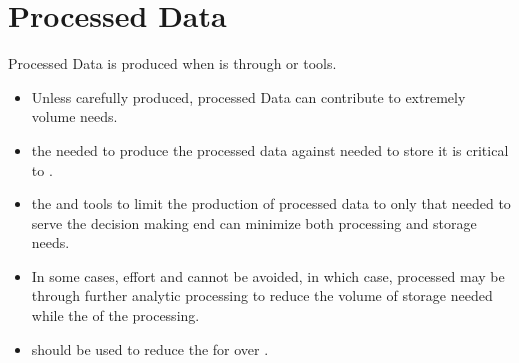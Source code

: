 \documentclass[letterpaper,12pt,english]{sphinxmanual}
\begin{document}
\section{Processed Data}
\label{\detokenize{requirements/data/processed:processed-data}}\label{\detokenize{requirements/data/processed::doc}}
\sphinxAtStartPar
Processed Data is produced when  is  through
 or  tools.
\begin{itemize}
\item {} 
\sphinxAtStartPar
Unless carefully produced, processed Data can contribute to extremely  volume needs.

\item {} 
\sphinxAtStartPar
{} the  needed to produce the processed data against  needed to store it is critical to .

\item {} 
\sphinxAtStartPar
{} the  and  tools to limit the production of processed data to only that needed to serve the decision making end can minimize both processing and storage needs.

\item {} 
\sphinxAtStartPar
In some cases,  effort and  cannot be avoided, in which case, processed may be  through further analytic processing to reduce the volume of storage needed while  the  of the processing.

\item {} 
\sphinxAtStartPar
{} should be used to reduce the  for  over .

\end{itemize}
\end{document}
